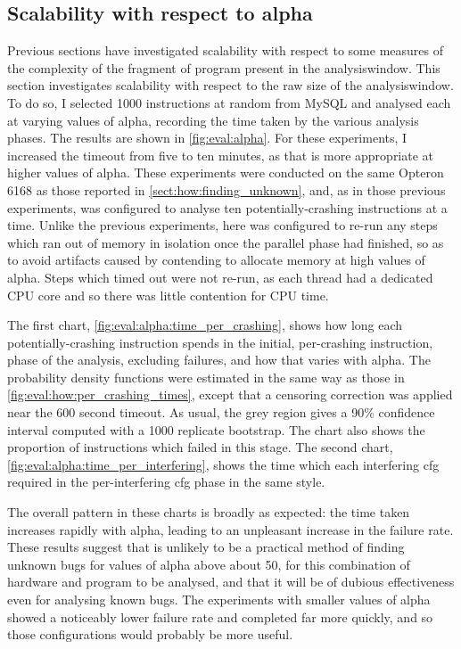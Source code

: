 \subsection{Scalability with respect to \gls{alpha}}



\noindent
Previous sections have investigated scalability with respect to some
measures of the complexity of the fragment of program present in the
\gls{analysiswindow}.  This section investigates scalability with
respect to the raw size of the \gls{analysiswindow}.  To do so, I
selected 1000 instructions at random from MySQL and analysed each at
varying values of \gls{alpha}, recording the time taken by the various
analysis phases.  The results are shown in \autoref{fig:eval:alpha}.
For these experiments, I increased the timeout from five to ten
minutes, as that is more appropriate at higher values of \gls{alpha}.
These experiments were conducted on the same Opteron 6168 as those
reported in \autoref{sect:how:finding_unknown}, and, as in those
previous experiments, {\implementation} was configured to analyse ten
potentially-crashing instructions at a time.  Unlike the previous
experiments, here {\implementation} was configured to re-run any steps
which ran out of memory in isolation once the parallel phase had
finished, so as to avoid artifacts caused by contending to allocate
memory at high values of \gls{alpha}.  Steps which timed out were not
re-run, as each thread had a dedicated CPU core and so there was
little contention for CPU time.

The first chart, \autoref{fig:eval:alpha:time_per_crashing}, shows how
long each potentially-crashing instruction spends in the initial,
per-crashing instruction, phase of the analysis, excluding failures,
and how that varies with \gls{alpha}.  The probability density
functions were estimated in the same way as those in
\autoref{fig:eval:how:per_crashing_times}, except that a censoring
correction was applied near the 600 second timeout.  As usual, the
grey region gives a 90\% confidence interval computed with a 1000
replicate bootstrap.  The chart also shows the proportion of
instructions which failed in this stage.  The second chart,
\autoref{fig:eval:alpha:time_per_interfering}, shows the time which
each interfering \gls{cfg} required in the per-interfering \gls{cfg}
phase in the same style.

The overall pattern in these charts is broadly as expected: the time
taken increases rapidly with \gls{alpha}, leading to an unpleasant
increase in the failure rate.  These results suggest that {\technique}
is unlikely to be a practical method of finding unknown bugs for
values of \gls{alpha} above about 50, for this combination of hardware
and program to be analysed, and that it will be of dubious
effectiveness even for analysing known bugs.  The experiments with
smaller values of \gls{alpha} showed a noticeably lower failure rate
and completed far more quickly, and so those configurations would
probably be more useful.

